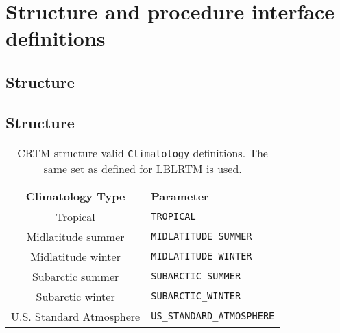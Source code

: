 \chapter{Structure and procedure interface definitions}
\label{sec:structure_and_interface_definition}

\clearpage
\section{\ChannelInfo{} Structure}
\label{sec:channelinfo_structure}











\clearpage
\section{\Atmosphere{} Structure}
\label{sec:atmosphere_structure}



\begin{table}[htp]
  \centering
  \begin{tabular}{c l}
    \hline
    \sffamily\textbf{Climatology Type} & \sffamily\textbf{Parameter} \\
    \hline\hline
             Tropical          &  \texttt{TROPICAL}\\              
        Midlatitude summer     &  \texttt{MIDLATITUDE\_SUMMER}\\
        Midlatitude winter     &  \texttt{MIDLATITUDE\_WINTER}\\
         Subarctic summer      &  \texttt{SUBARCTIC\_SUMMER}\\
         Subarctic winter      &  \texttt{SUBARCTIC\_WINTER}\\
     U.S. Standard Atmosphere  &  \texttt{US\_STANDARD\_ATMOSPHERE}\\
    \hline 
  \end{tabular}
  \caption{CRTM \Atmosphere{} structure valid \texttt{Climatology} definitions. The same set as defined for LBLRTM is used.}
  \label{tab:climatology}
\end{table}


